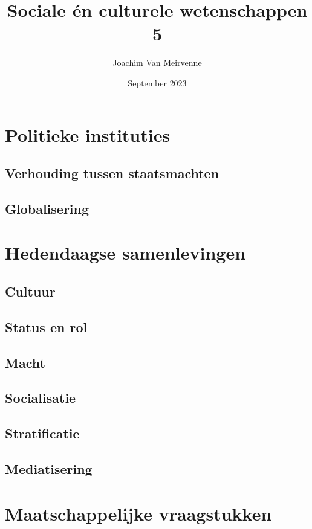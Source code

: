 \documentclass[a4paper,12pt, dutch, oneside ]{book}
\begin{document}
\author{Joachim Van Meirvenne}
\title{Sociale \'en culturele wetenschappen 5}
\date{September 2023}

\frontmatter
\maketitle
\tableofcontents

\mainmatter

\part{Politieke instituties}


\chapter{Verhouding tussen staatsmachten}
\chapter{Globalisering}

\part{Hedendaagse samenlevingen}
\chapter{Cultuur}
\chapter{Status en rol}
\chapter{Macht}
\chapter{Socialisatie}
\chapter{Stratificatie}
\chapter{Mediatisering}

\part{Maatschappelijke vraagstukken}

%


\end{document}
